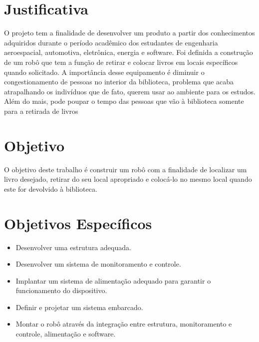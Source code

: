 \section{Justificativa}
O projeto tem a finalidade de desenvolver um produto a partir dos conhecimentos adquiridos durante o período acadêmico dos estudantes de engenharia aeroespacial, automotiva, eletrônica, energia e software. Foi definida a construção de um robô que tem a função de retirar e colocar livros em locais específicos quando solicitado. A importância desse equipamento é diminuir o congestionamento de pessoas no interior da biblioteca, problema que acaba atrapalhando os indivíduos que de fato, querem usar ao ambiente para os estudos.  Além do mais, pode poupar o tempo das pessoas que vão à biblioteca somente para a retirada de livros

\section{Objetivo}
O objetivo deste trabalho é construir um robô com a finalidade de localizar um livro desejado, retirar do seu local apropriado e colocá-lo no mesmo local quando este for devolvido à biblioteca.

\section{Objetivos Específicos}
\begin{itemize}
\item Desenvolver uma estrutura adequada.
\item Desenvolver um sistema de monitoramento e controle.
\item Implantar um sistema de alimentação adequado para garantir o funcionamento do dispositivo.
\item Definir e projetar um sistema embarcado.
\item Montar o robô através da integração entre estrutura, monitoramento e controle, alimentação e software. 
\end{itemize}
